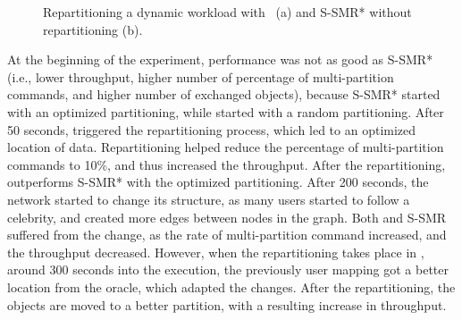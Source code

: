 \begin{figure}[h!]
\begin{subfigure}{.40\textwidth}
    \caption{}
  \end{subfigure}
  \caption{Repartitioning a dynamic workload with \dynastar~(a) and S-SMR* without repartitioning (b).}%
  \label{fig:socialcelebrity}
\end{figure}

At the beginning of the experiment, \dynastar performance was not as good as S-SMR* (i.e., lower throughput, higher number of
percentage of multi-partition commands, and higher number of exchanged objects), because S-SMR* started with an optimized
partitioning, while \dynastar started with a random partitioning. 
After 50 seconds, \dynastar triggered the repartitioning process, which led to an optimized location of data. Repartitioning helped
reduce the percentage of multi-partition commands to 10\%, and thus increased the throughput. After the repartitioning, \dynastar outperforms S-SMR* with the optimized partitioning.
After 200 seconds, the network started to change its structure, as many users started to follow a celebrity, and created more edges
between nodes in the graph. Both \dynastar and S-SMR suffered from the change, as the rate of multi-partition command increased, and the throughput
decreased. However, when the repartitioning takes place in \dynastar, around 300 seconds into the execution, the previously user mapping
got a better location from the oracle, which adapted the changes. After the repartitioning, the objects are moved to a better partition, with a resulting increase in throughput.


